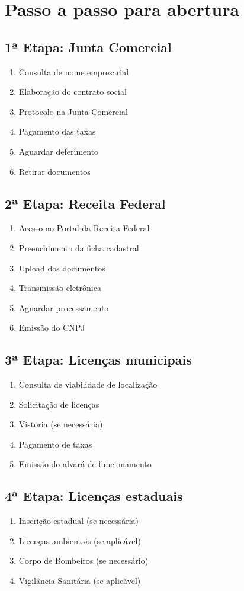 \documentclass[12pt,a4paper]{article}
\begin{document}
\section{Passo a passo para abertura}

\subsection{1ª Etapa: Junta Comercial}
\begin{enumerate}
    \item Consulta de nome empresarial
    \item Elaboração do contrato social
    \item Protocolo na Junta Comercial
    \item Pagamento das taxas
    \item Aguardar deferimento
    \item Retirar documentos
\end{enumerate}

\subsection{2ª Etapa: Receita Federal}
\begin{enumerate}
    \item Acesso ao Portal da Receita Federal
    \item Preenchimento da ficha cadastral
    \item Upload dos documentos
    \item Transmissão eletrônica
    \item Aguardar processamento
    \item Emissão do CNPJ
\end{enumerate}

\subsection{3ª Etapa: Licenças municipais}
\begin{enumerate}
    \item Consulta de viabilidade de localização
    \item Solicitação de licenças
    \item Vistoria (se necessária)
    \item Pagamento de taxas
    \item Emissão do alvará de funcionamento
\end{enumerate}

\subsection{4ª Etapa: Licenças estaduais}
\begin{enumerate}
    \item Inscrição estadual (se necessária)
    \item Licenças ambientais (se aplicável)
    \item Corpo de Bombeiros (se necessário)
    \item Vigilância Sanitária (se aplicável)
\end{enumerate}
\end{document}
